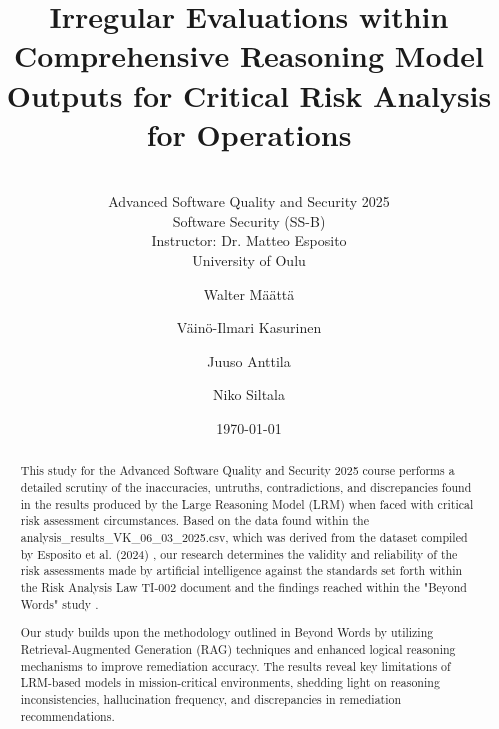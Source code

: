 \documentclass[sigconf]{acmart}
\begin{document}
\title{Irregular Evaluations within Comprehensive Reasoning Model Outputs for Critical Risk Analysis for Operations}
\subtitle{\\[0.5cm] Advanced Software Quality and Security 2025 \\ Software Security (SS-B) \\ Instructor: Dr. Matteo Esposito \\ University of Oulu}

\author{Walter Määttä}

\author{Väinö-Ilmari Kasurinen}

\author{Juuso Anttila}

\author{Niko Siltala}

\date{\today}

\begin{abstract}
  This study for the Advanced Software Quality and Security 2025 course performs a detailed scrutiny of the inaccuracies, untruths, contradictions, and discrepancies found in the results produced by the Large Reasoning Model (LRM) when faced with critical risk assessment circumstances. Based on the data found within the analysis\_results\_VK\_06\_03\_2025.csv, which was derived from the dataset compiled by Esposito et al. (2024) \citep{esposito2024dataset}, our research determines the validity and reliability of the risk assessments made by artificial intelligence against the standards set forth within the Risk Analysis Law TI-002 document and the findings reached within the "Beyond Words" study \citep{esposito2024beyond}.
  
  Our study builds upon the methodology outlined in Beyond Words \citep{esposito2024beyond} by utilizing Retrieval-Augmented Generation (RAG) techniques and enhanced logical reasoning mechanisms to improve remediation accuracy. The results reveal key limitations of LRM-based models in mission-critical environments, shedding light on reasoning inconsistencies, hallucination frequency, and discrepancies in remediation recommendations.
\end{abstract}

\end{document}
